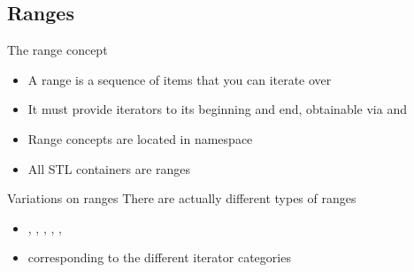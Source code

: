 \subsection[range]{Ranges}

\begin{frame}[fragile]
  \begin{block}{The range concept}
    \begin{itemize}
    \item A range is a sequence of items that you can iterate over
    \item It must provide iterators to its beginning and end, obtainable via  and 
    \item Range concepts are located in  namespace
    \item All STL containers are ranges
    \end{itemize}
  \end{block}
  \begin{exampleblock}{Variations on ranges}
    There are actually different types of ranges
    \begin{itemize}
    \item {}, , , , , 
    \item corresponding to the different iterator categories
    \end{itemize}
  \end{exampleblock}
\end{frame}

